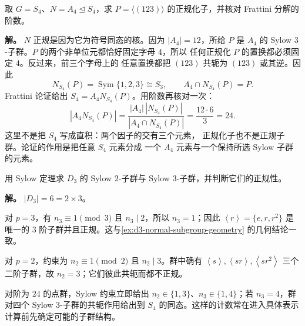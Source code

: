 \begin{example}
取 $G=S_4$、$N=A_4\mathrel{\trianglelefteq}S_4$，求 $P=\langle(123)\rangle$ 的正规化子，并核对 Frattini 分解的阶数。

\textbf{解。} $N$ 正规是因为它为符号同态的核。因为 $|A_4|=12$，所给 $P$ 是 $A_4$ 的
Sylow $3$-子群。$P$ 的两个非单位元都恰好固定字母 $4$，所以
任何正规化 $P$ 的置换都必须固定 $4$。反过来，前三个字母上的
任意置换都把 $(123)$ 共轭为 $(123)$ 或其逆。因此
\[
N_{S_4}(P)=\operatorname{Sym}\{1,2,3\}\cong S_3,
\qquad A_4\cap N_{S_4}(P)=P.
\]
Frattini 论证给出 $S_4=A_4N_{S_4}(P)$。用阶数再核对一次：
\[
|A_4N_{S_4}(P)|
=\frac{|A_4|\,|N_{S_4}(P)|}{|A_4\cap N_{S_4}(P)|}
=\frac{12\cdot6}{3}=24.
\]
这里不是把 $S_4$ 写成直积：两个因子的交有三个元素，
正规化子也不是正规子群。论证的作用是把任意 $S_4$ 元素分成
一个 $A_4$ 元素与一个保持所选 Sylow 子群的元素。
\end{example}


\begin{example}[{$D_3$ 的 Sylow 子群}]
用 Sylow 定理求 $D_3$ 的 Sylow $2$-子群与 Sylow $3$-子群，并判断它们的正规性。

\textbf{解。} $\lvert D_3\rvert=6=2\times3$。

对 $p=3$，有 $n_3\equiv1\pmod3$ 且 $n_3\mid2$，所以 $n_3=1$；因此
$\left\langle r\right\rangle=\{e,r,r^2\}$ 是唯一的 $3$ 阶子群并且正规。这与\cref{ex:d3-normal-subgroup-geometry} 的几何结论一致。

对 $p=2$，约束为 $n_2\equiv1\pmod2$ 且 $n_2\mid3$。群中确有
$\left\langle s\right\rangle,\left\langle sr\right\rangle,\left\langle sr^2\right\rangle$ 三个二阶子群，故 $n_2=3$；它们彼此共轭而都不正规。
\end{example}

对阶为 $24$ 的点群，Sylow 约束立即给出 $n_2\in\{1,3\}$、$n_3\in\{1,4\}$；若 $n_3=4$，群对四个 Sylow $3$-子群的共轭作用给出到 $S_4$ 的同态。这样的计数常在进入具体表示计算前先确定可能的子群结构。

